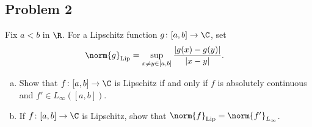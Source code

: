 \documentclass[10pt]{mypackage}
\begin{document}
\subsection{Problem 2}%
\begin{problem}
  Fix $a < b$ in $\R$. For a Lipschitz function $g\colon [a,b]\rightarrow \C$, set
  \begin{align*}
    \norm{g}_{\text{Lip}} &= \sup_{x\neq y\in[a,b]} \frac{\left\vert g(x)-g(y) \right\vert}{\left\vert x-y \right\vert}.
  \end{align*}
  \begin{enumerate}[(a)]
    \item Show that $f\colon [a,b]\rightarrow \C$ is Lipschitz if and only if $f$ is absolutely continuous and $f'\in L_{\infty}\left( [a,b] \right)$.
    \item If $f\colon [a,b]\rightarrow \C$ is Lipschitz, show that $\norm{f}_{\text{Lip}} = \norm{f'}_{L_{\infty}}$.
  \end{enumerate}
\end{problem}
\end{document}
